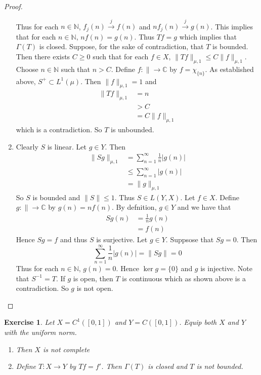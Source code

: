 \documentclass[12pt]{amsart}
\newtheorem{ex}[thm]{Exercise}
\newcommand{\Gam}{\Gamma}
\newcommand{\C}{\mathbb{C}}
\newcommand{\N}{\mathbb{N}}
\newcommand{\conv}[1]{\xrightarrow{#1}}
\begin{document}
\begin{proof}
\begin{enumerate}
			Thus for each $n \in \N$, $f_j(n) \conv{j} f(n)$ and $nf_j(n) \conv{j} g(n)$. This implies that for each $n \in \N$, $nf(n) = g(n)$. Thus $Tf = g$ which implies that $\Gam(T)$ is closed. Suppose, for the sake of contradiction, that $T$ is bounded. Then there exists $C \geq 0$ such that for each $f \in X$, $\|Tf \|_{\mu,1} \leq C \|f \|_{\mu, 1}$. Choose $n \in \N$ such that $n > C$. Define $f: \|\rightarrow \C$ by $f = \chi_{\{n\}}$. As established above, $S^+ \subset L^1(\mu)$. Then $\|f \|_{\mu,1} = 1$ and
			\begin{align*}
				\|Tf \|_{\mu,1}
				& = n \\
				&> C\\
				& = C \|f \|_{\mu,1}
			\end{align*}
			which is a contradiction. So $T$ is unbounded.
			\item Clearly $S$ is linear. Let $g \in Y$. Then \begin{align*}
				\|Sg \|_{\mu,1} 
				&= \sum_{n =1}^{\infty} \frac{1}{n} \vert g(n) \vert \\
				& \leq  \sum_{n =1}^{\infty} \vert g(n) \vert \\
				& = \|g \|_{\mu,1}
			\end{align*}
			So $S$ is bounded and $\|S \|\leq 1$. Thus $S \in L(Y,X)$. Let $f \in X$. Define $g: \|\rightarrow \C$ by $g(n) = nf(n)$. By defnition, $g \in Y$ and we have that
			\begin{align*}
				Sg(n) 
				&= \frac{1}{n}g(n) \\
				& = f(n)
			\end{align*}
			Hence $Sg =f$ and thus $S$ is surjective. Let $g \in Y$. Suppsose that $Sg = 0$. Then $$\sum_{n=1}^{\infty} \frac{1}{n}\vert g(n)\vert =\|Sg \| = 0$$ Thus for each $n \in \N$, $g(n) = 0$. Hence $\ker g = \{0\}$ and $g$ is injective. Note that $S^{-1} = T$. If $g$ is open, then $T$ is continuous which as shown above is a contradiction. So $g$ is not open. 
		\end{enumerate}
	\end{proof}
	
	\begin{ex}
		Let $X = C^1([0,1])$ and $Y=C([0,1])$. Equip both $X$ and $Y$ with the uniform norm. 
		\begin{enumerate}
			\item Then $X$ is not complete
			\item Define $T: X \rightarrow Y$ by $Tf = f'$. Then $\Gam(T)$ is closed and $T$ is not bounded. 
		\end{enumerate}
	\end{ex}
	
\end{document}
